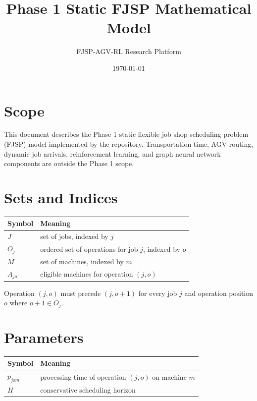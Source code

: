 ﻿\documentclass[11pt]{article}
\title{Phase 1 Static FJSP Mathematical Model}
\author{FJSP-AGV-RL Research Platform}
\date{\today}
\begin{document}
\maketitle

\section{Scope}

This document describes the Phase 1 static flexible job shop scheduling
problem (FJSP) model implemented by the repository. Transportation time,
AGV routing, dynamic job arrivals, reinforcement learning, and graph neural
network components are outside the Phase 1 scope.

\section{Sets and Indices}

\begin{table}[h]
\centering
\begin{tabular}{ll}
\toprule
Symbol & Meaning \\
\midrule
$J$ & set of jobs, indexed by $j$ \\
$O_j$ & ordered set of operations for job $j$, indexed by $o$ \\
$M$ & set of machines, indexed by $m$ \\
$A_{jo}$ & eligible machines for operation $(j,o)$ \\
\bottomrule
\end{tabular}
\end{table}

Operation $(j,o)$ must precede $(j,o+1)$ for every job $j$ and operation
position $o$ where $o+1 \in O_j$.

\section{Parameters}

\begin{table}[h]
\centering
\begin{tabular}{ll}
\toprule
Symbol & Meaning \\
\midrule
$p_{jom}$ & processing time of operation $(j,o)$ on machine $m$ \\
$H$ & conservative scheduling horizon \\
\bottomrule
\end{tabular}
\end{table}
\end{document}
